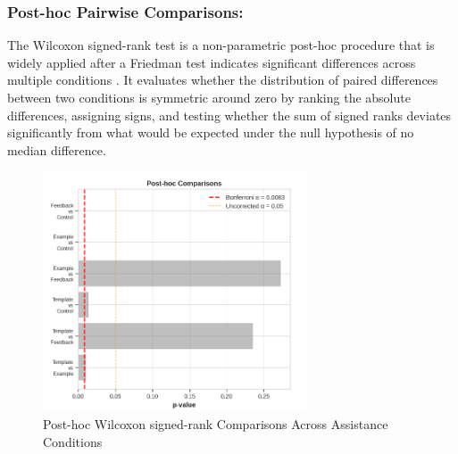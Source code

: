 \subsubsection{Post-hoc Pairwise Comparisons:}

The Wilcoxon signed-rank test is a non-parametric post-hoc procedure that is widely applied after a Friedman test indicates significant differences across multiple conditions \cite{Benavoli2016Should} \cite{Xiang2022Large}. It evaluates whether the distribution of paired differences between two conditions is symmetric around zero by ranking the absolute differences, assigning signs, and testing whether the sum of signed ranks deviates significantly from what would be expected under the null hypothesis of no median difference.

\begin{figure}[h]
\centering
\includegraphics[width=0.7\textwidth]{figures/05.png}
\caption{Post-hoc Wilcoxon signed-rank Comparisons Across Assistance Conditions}
\label{fig:posthoc_wilcoxon}
\end{figure}

